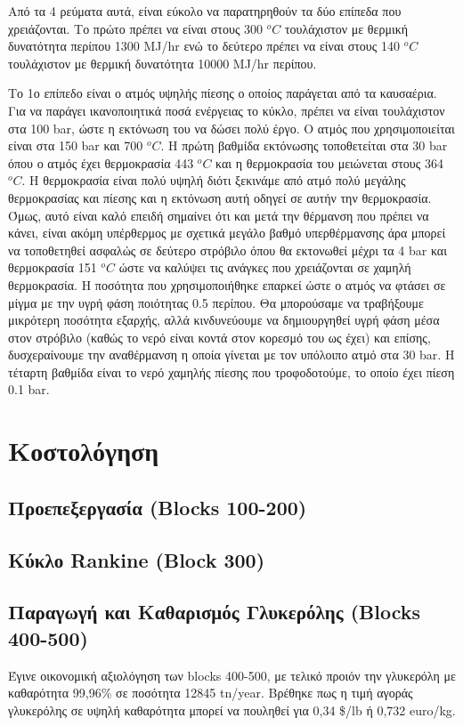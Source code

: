 \documentclass[11pt]{article}
\begin{document}
Από τα 4 ρεύματα αυτά, είναι εύκολο να παρατηρηθούν τα δύο επίπεδα που χρειάζονται. Το πρώτο πρέπει να είναι στους 300 \(^oC\) τουλάχιστον με θερμική δυνατότητα περίπου 1300 MJ/hr ενώ το δεύτερο πρέπει να είναι στους 140 \(^oC\) τουλάχιστον με θερμική δυνατότητα 10000 MJ/hr περίπου. 

Το 1ο επίπεδο είναι ο ατμός υψηλής πίεσης ο οποίος παράγεται από τα καυσαέρια. Για να παράγει ικανοποιητικά ποσά ενέργειας το κύκλο, πρέπει να είναι τουλάχιστον στα 100 bar, ώστε η εκτόνωση του να δώσει πολύ έργο. Ο ατμός που χρησιμοποιείται είναι στα 150 bar και 700 \(^oC\). Η πρώτη βαθμίδα εκτόνωσης τοποθετείται στα 30 bar όπου ο ατμός έχει θερμοκρασία 443 \(^oC\) και η θερμοκρασία του μειώνεται στους 364 \(^oC\). Η θερμοκρασία είναι πολύ υψηλή διότι ξεκινάμε από ατμό πολύ μεγάλης θερμοκρασίας και πίεσης και η εκτόνωση αυτή οδηγεί σε αυτήν την θερμοκρασία. Όμως, αυτό είναι καλό επειδή σημαίνει ότι και μετά την θέρμανση που πρέπει να κάνει, είναι ακόμη υπέρθερμος με σχετικά μεγάλο βαθμό υπερθέρμανσης άρα μπορεί να τοποθετηθεί ασφαλώς σε δεύτερο στρόβιλο όπου θα εκτονωθεί μέχρι τα 4 bar και θερμοκρασία 151 \(^oC\) ώστε να καλύψει τις ανάγκες που χρειάζονται σε χαμηλή θερμοκρασία. Η ποσότητα που χρησιμοποιήθηκε επαρκεί ώστε ο ατμός να φτάσει σε μίγμα με την υγρή φάση ποιότητας 0.5 περίπου. Θα μπορούσαμε να τραβήξουμε μικρότερη ποσότητα εξαρχής, αλλά κινδυνεύουμε να δημιουργηθεί υγρή φάση μέσα στον στρόβιλο (καθώς το νερό είναι κοντά στον κορεσμό του ως έχει) και επίσης, δυσχεραίνουμε την αναθέρμανση η οποία γίνεται με τον υπόλοιπο ατμό στα 30 bar. Η τέταρτη βαθμίδα είναι το νερό χαμηλής πίεσης που τροφοδοτούμε, το οποίο έχει πίεση 0.1 bar.

\section{Κοστολόγηση}
\label{sec:org733e000}
\subsection{Προεπεξεργασία (Blocks 100-200)}
\label{sec:org6503c64}

\subsection{Κύκλο Rankine (Block 300)}
\label{sec:orgd677bc1}

\subsection{Παραγωγή και Καθαρισμός Γλυκερόλης (Blocks 400-500)}
\label{sec:orgbfde71e}
Έγινε οικονομική αξιολόγηση των blocks 400-500, με τελικό προιόν την
γλυκερόλη με καθαρότητα 99,96\% σε ποσότητα 12845 tn/year. Βρέθηκε
πως η τιμή αγοράς γλυκερόλης σε υψηλή καθαρότητα μπορεί να πουληθεί
για 0,34 \$/lb ή 0,732 euro/kg.
\end{document}

